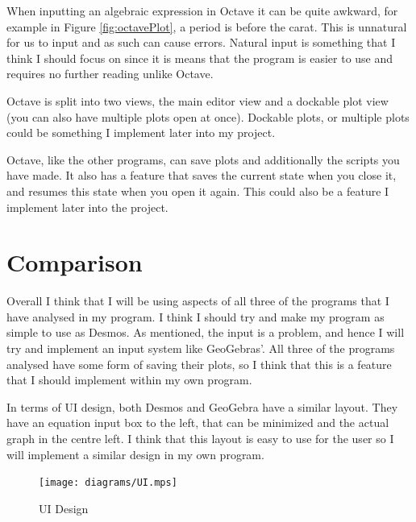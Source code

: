 \documentclass[../../../main.tex]{subfiles}
\begin{document}
When inputting an algebraic expression in Octave it can be quite awkward, for example in Figure \ref{fig:octavePlot}, a period is before the carat. This is unnatural for us to input and as such can cause errors. Natural input is something that I think I should focus on since it is means that the program is easier to use and requires no further reading unlike Octave.

Octave is split into two views, the main editor view and a dockable plot view (you can also have multiple plots open at once). Dockable plots, or multiple plots could be something I implement later into my project.

Octave, like the other programs, can save plots and additionally the scripts you have made. It also has a feature that saves the current state when you close it, and resumes this state when you open it again. This could also be a feature I implement later into the project.

\section{Comparison}
Overall I think that I will be using aspects of all three of the programs that I have analysed in my program. I think I should try and make my program as simple to use as Desmos. As mentioned, the input is a problem, and hence I will try and implement an input system like GeoGebras'. All three of the programs analysed have some form of saving their plots, so I think that this is a feature that I should implement within my own program.

In terms of UI design, both Desmos and GeoGebra have a similar layout. They have an equation input box to the left, that can be minimized and the actual graph in the centre left. I think that this layout is easy to use for the user so I will implement a similar design in my own program.

\begin{figure}[H]
	\begin{center}
		\texttt{[image: diagrams/UI.mps]}
	\end{center}
	\caption{UI Design}
\end{figure}
\end{document}
